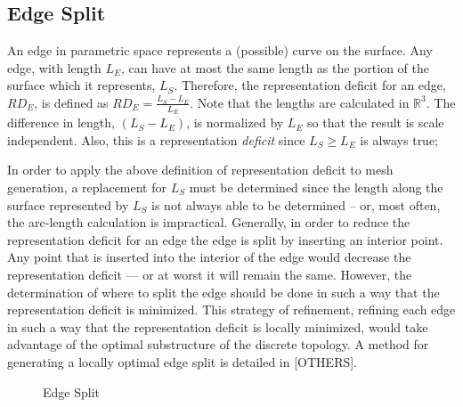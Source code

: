 \subsection{Edge Split}
An edge in parametric space represents a (possible) curve on the
surface. Any edge, with length $L_E$, can have at most the same length
as the portion of the surface which it represents, $L_S$. Therefore, the
representation deficit for an edge, $RD_E$, is defined as $RD_E =
\frac{L_S - L_E}{L_E}$. Note that the lengths are calculated in
${\mathbb R}^3$. The difference in length, $\left(L_S - L_E\right)$, is
normalized by $L_E$ so that the result is scale independent. Also, this
is a representation {\it deficit} since $L_S \ge L_E$ is always true;

In order to apply the above definition of representation deficit to mesh
generation, a replacement for $L_S$ must be determined since the length
along the surface represented by $L_S$ is not always able to be
determined -- or, most often, the arc-length calculation is impractical.
Generally, in order to reduce the representation deficit for an edge the
edge is split by inserting an interior point. Any point that is inserted
into the interior of the edge would decrease the representation deficit
--- or at worst it will remain the same. However, the determination of
where to split the edge should be done in such a way that the
representation deficit is minimized. This strategy of refinement,
refining each edge in such a way that the representation deficit is
locally minimized, would take advantage of the optimal substructure of
the discrete topology. A method for generating a locally optimal edge
split is detailed in \cite{mclaurin12,mclaurin13}[OTHERS].

\begin{figure}[h!]
  \caption{Edge Split}
\end{figure}

